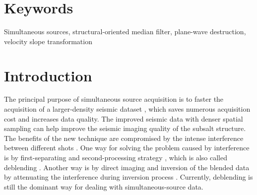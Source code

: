 \section{Keywords}
Simultaneous sources, structural-oriented median filter, plane-wave destruction, velocity slope transformation

\section{Introduction}
 The principal purpose of simultaneous source acquisition is to faster the acquisition of a larger-density seismic dataset , which saves numerous acquisition cost and increases data quality. The improved seismic data with denser spatial sampling can  help improve the seismic imaging quality of the subsalt structure. The benefits of the new technique are compromised by the intense interference between different shots \cite[]{berkhout2008}. One way for solving the problem caused by interference is by first-separating and second-processing strategy \cite[]{yangkang20142}, which is also called deblending \cite[]{akerberg2008,abma2010,mediandeblend,sep,blac2012,proj,panagiotis20122,araz2012,bagaini2012,chengbo2013,yangkang2014,yangkang2014nmo,berkhout2014seg,yangkang2014svmf,qushan2015,yangkang2015dbortho,shaohuan2015}. Another way is by direct imaging and inversion of the blended data by attenuating the interference during inversion process \cite[]{verschuur2011,daiwei2011,zhiguang2014,yangkang2015image,shuwei2015vel}. Currently, deblending is still the dominant way for dealing with simultaneous-source data. 

